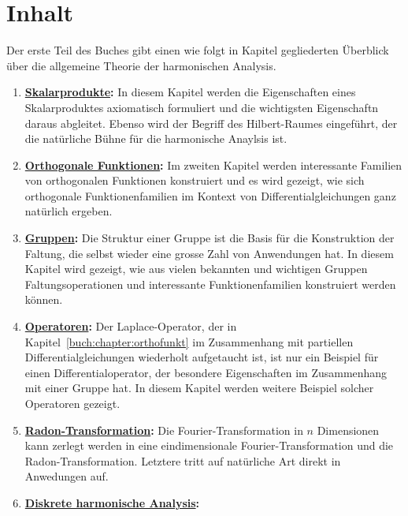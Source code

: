 %
%
%
\section{Inhalt
\label{buch:einleitung:section:inhalt}}
Der erste Teil des Buches gibt einen wie folgt in Kapitel gegliederten
Überblick über die allgemeine Theorie der harmonischen Analysis.

\begin{enumerate}
\item {\bf \hyperref[buch:chapter:skalarprodukte]{Skalarprodukte}:}
In diesem Kapitel werden die Eigenschaften eines Skalarproduktes 
axiomatisch formuliert und die wichtigsten Eigenschaftn daraus
abgleitet.
Ebenso wird der Begriff des Hilbert-Raumes eingeführt, der die natürliche
%
Bühne für die harmonische Anaylsis ist.
\item {\bf \hyperref[buch:chapter:orthofunkt]{Orthogonale Funktionen}:}
%
Im zweiten Kapitel werden interessante Familien von orthogonalen
Funktionen konstruiert und es wird gezeigt, wie sich orthogonale
Funktionenfamilien im Kontext von Differentialgleichungen ganz natürlich
%
ergeben.
\item {\bf \hyperref[buch:chapter:gruppen]{Gruppen}:}
Die Struktur einer Gruppe ist die Basis für die Konstruktion der Faltung,
die selbst wieder eine grosse Zahl von Anwendungen hat.
In diesem Kapitel wird gezeigt, wie aus vielen bekannten und wichtigen
Gruppen Faltungsoperationen und interessante Funktionenfamilien
konstruiert werden können.
\item {\bf \hyperref[buch:chapter:operatoren]{Operatoren}:}
Der Laplace-Operator, der in Kapitel~\ref{buch:chapter:orthofunkt}
%
im Zusammenhang mit partiellen Differentialgleichungen wiederholt
%
aufgetaucht ist, ist nur ein Beispiel für einen Differentialoperator,
der besondere Eigenschaften im Zusammenhang mit einer Gruppe hat.
In diesem Kapitel werden weitere Beispiel solcher Operatoren gezeigt.
\item {\bf \hyperref[buch:chapter:radon]{Radon-Transformation}:}
Die Fourier-Transformation in $n$ Dimensionen kann zerlegt werden in
eine eindimensionale Fourier-Transformation und die Radon-Transformation.
%
Letztere tritt auf natürliche Art direkt in Anwedungen auf.
\item {\bf \hyperref[buch:chapter:diskret]{Diskrete harmonische Analysis}:}

\end{enumerate}

